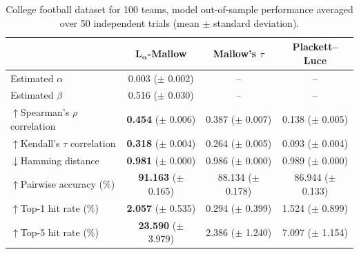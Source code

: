 \documentclass{article}
\begin{document}
\begin{table}[h!]
\centering
\setlength{\tabcolsep}{8pt}
\begin{tabular}{|l|c|c|c|}
\hline
 & \textbf{$\boldsymbol{L}_{\boldsymbol{\alpha}}$-Mallow} &  {Mallow's $\tau$} & {Plackett--Luce} \\
\hline
 Estimated $\alpha$      & 0.003 ($\pm$ 0.002)  & --               & --               \\
 Estimated $\beta$       & 0.516 ($\pm$ 0.030)  & --               & --               \\
 \hline
$\uparrow$Spearman's $\rho$ correlation      & \textbf{0.454 }($\pm$ 0.006)  & 0.387 ($\pm$ 0.007)  & 0.138 ($\pm$ 0.005)  \\
$\uparrow$Kendall's $\tau$ correlation  & \textbf{0.318} ($\pm$ 0.004)  & 0.264 ($\pm$ 0.005)  & 0.093 ($\pm$ 0.004)  \\
$\downarrow$Hamming distance    & \textbf{0.981} ($\pm$ 0.000)  & 0.986 ($\pm$ 0.000)  & 0.989 ($\pm$ 0.000)  \\
$\uparrow$Pairwise accuracy (\%)  &\textbf{ 91.163} ($\pm$ 0.165) & 88.134 ($\pm$ 0.178) & 86.944 ($\pm$ 0.133) \\
$\uparrow$Top-1 hit rate (\%) & \textbf{2.057} ($\pm$ 0.535)  & 0.294 ($\pm$ 0.399)  & 1.524 ($\pm$ 0.899)  \\
$\uparrow$Top-5 hit rate (\%) & \textbf{23.590} ($\pm$ 3.979) & 2.386 ($\pm$ 1.240)  & 7.097 ($\pm$ 1.154)  \\
\hline
\end{tabular}
\caption{College football dataset for 100 teams, model out-of-sample performance averaged over 50 independent trials (mean $\pm$ standard deviation).}
\label{tab:mle_comparison_football_100_teams}
\end{table}






\end{document}
